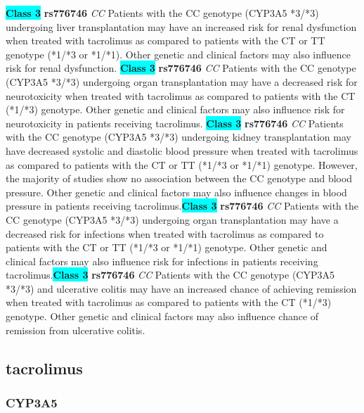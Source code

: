 \documentclass{book}
\begin{document}
\begin{center}
\textbf{\colorbox{cyan} {Class 3}} \textbf{ rs776746 } \textit{ CC }
Patients with the CC genotype (CYP3A5 *3/*3) undergoing liver transplantation may have an increased risk for renal dysfunction when treated with tacrolimus as compared to patients with the CT or TT genotype (*1/*3 or *1/*1). Other genetic and clinical factors may also influence risk for renal dysfunction. \textbf{\colorbox{cyan} {Class 3}} \textbf{ rs776746 } \textit{ CC }
Patients with the CC genotype (CYP3A5 *3/*3) undergoing organ transplantation may have a decreased risk for neurotoxicity when treated with tacrolimus as compared to patients with the CT (*1/*3) genotype. Other genetic and clinical factors may also influence risk for neurotoxicity in patients receiving tacrolimus. \textbf{\colorbox{cyan} {Class 3}} \textbf{ rs776746 } \textit{ CC }
Patients with the CC genotype (CYP3A5 *3/*3) undergoing kidney transplantation may have decreased systolic and diastolic blood pressure when treated with tacrolimus as compared to patients with the CT or TT (*1/*3 or *1/*1) genotype. However, the majority of studies show no association between the CC genotype and blood pressure. Other genetic and clinical factors may also influence changes in blood pressure in patients receiving tacrolimus.\textbf{\colorbox{cyan} {Class 3}} \textbf{ rs776746 } \textit{ CC }
Patients with the CC genotype (CYP3A5 *3/*3) undergoing organ transplantation may have a decreased risk for infections when treated with tacrolimus as compared to patients with the CT or TT (*1/*3 or *1/*1) genotype. Other genetic and clinical factors may also influence risk for infections in patients receiving tacrolimus.\textbf{\colorbox{cyan} {Class 3}} \textbf{ rs776746 } \textit{ CC }
Patients with the CC genotype (CYP3A5 *3/*3) and ulcerative colitis may have an increased chance of achieving remission when treated with tacrolimus as compared to patients with the CT (*1/*3) genotype. Other genetic and clinical factors may also influence chance of remission from ulcerative colitis. 


\end{center}\subsection{ tacrolimus }


\subsubsection{ CYP3A5 }
\end{document}
